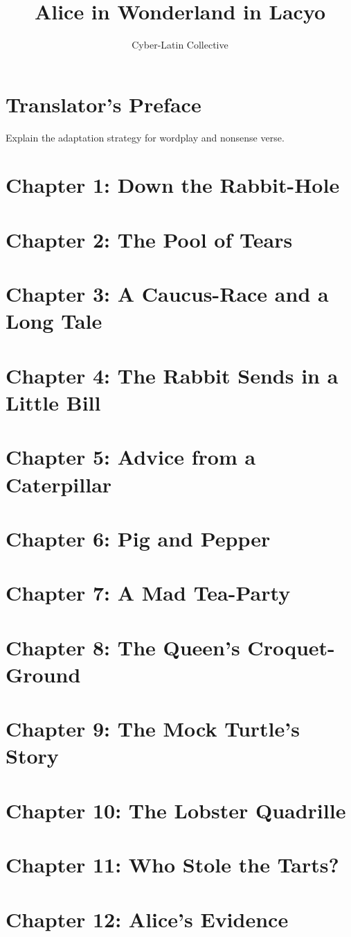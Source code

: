 \documentclass[12pt]{book}
\title{Alice in Wonderland in Lacyo}
\author{Cyber-Latin Collective}
\date{}
\begin{document}
\maketitle
\tableofcontents

\chapter{Translator's Preface}
Explain the adaptation strategy for wordplay and nonsense verse.

\chapter{Chapter 1: Down the Rabbit-Hole}
\chapter{Chapter 2: The Pool of Tears}
\chapter{Chapter 3: A Caucus-Race and a Long Tale}
\chapter{Chapter 4: The Rabbit Sends in a Little Bill}
\chapter{Chapter 5: Advice from a Caterpillar}
\chapter{Chapter 6: Pig and Pepper}
\chapter{Chapter 7: A Mad Tea-Party}
\chapter{Chapter 8: The Queen's Croquet-Ground}
\chapter{Chapter 9: The Mock Turtle's Story}
\chapter{Chapter 10: The Lobster Quadrille}
\chapter{Chapter 11: Who Stole the Tarts?}
\chapter{Chapter 12: Alice's Evidence}
\end{document}
